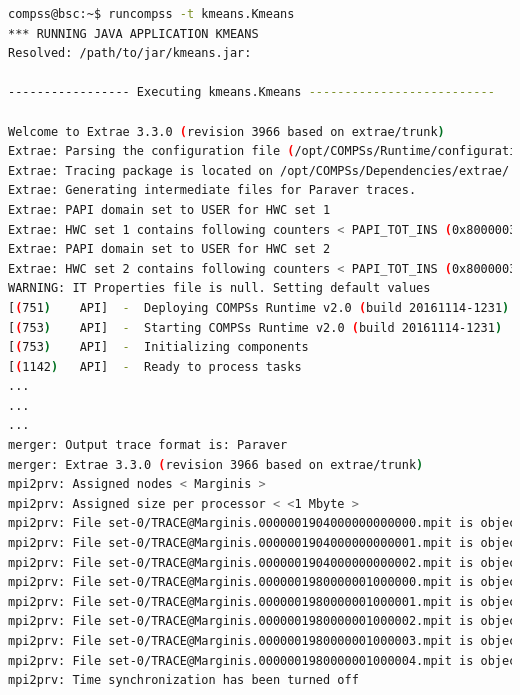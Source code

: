 \begin{lstlisting}[language=bash]
compss@bsc:~$ runcompss -t kmeans.Kmeans
*** RUNNING JAVA APPLICATION KMEANS
Resolved: /path/to/jar/kmeans.jar:

----------------- Executing kmeans.Kmeans --------------------------

Welcome to Extrae 3.3.0 (revision 3966 based on extrae/trunk)
Extrae: Parsing the configuration file (/opt/COMPSs/Runtime/configuration/xml/tracing/extrae_basic.xml) begins
Extrae: Tracing package is located on /opt/COMPSs/Dependencies/extrae/
Extrae: Generating intermediate files for Paraver traces.
Extrae: PAPI domain set to USER for HWC set 1
Extrae: HWC set 1 contains following counters < PAPI_TOT_INS (0x80000032) PAPI_TOT_CYC (0x8000003b) PAPI_LD_INS (0x80000035) PAPI_SR_INS (0x80000036) > - changing every 500000000 nanoseconds
Extrae: PAPI domain set to USER for HWC set 2
Extrae: HWC set 2 contains following counters < PAPI_TOT_INS (0x80000032) PAPI_TOT_CYC (0x8000003b) PAPI_LD_INS (0x80000035) PAPI_SR_INS (0x80000036) PAPI_L2_DCM (0x80000002) > - changing every 500000000 nanoseconds
WARNING: IT Properties file is null. Setting default values
[(751)    API]  -  Deploying COMPSs Runtime v2.0 (build 20161114-1231)
[(753)    API]  -  Starting COMPSs Runtime v2.0 (build 20161114-1231)
[(753)    API]  -  Initializing components
[(1142)   API]  -  Ready to process tasks
...
...
...
merger: Output trace format is: Paraver
merger: Extrae 3.3.0 (revision 3966 based on extrae/trunk)
mpi2prv: Assigned nodes < Marginis >
mpi2prv: Assigned size per processor < <1 Mbyte >
mpi2prv: File set-0/TRACE@Marginis.0000001904000000000000.mpit is object 1.1.1 on node Marginis assigned to processor 0
mpi2prv: File set-0/TRACE@Marginis.0000001904000000000001.mpit is object 1.1.2 on node Marginis assigned to processor 0
mpi2prv: File set-0/TRACE@Marginis.0000001904000000000002.mpit is object 1.1.3 on node Marginis assigned to processor 0
mpi2prv: File set-0/TRACE@Marginis.0000001980000001000000.mpit is object 1.2.1 on node Marginis assigned to processor 0
mpi2prv: File set-0/TRACE@Marginis.0000001980000001000001.mpit is object 1.2.2 on node Marginis assigned to processor 0
mpi2prv: File set-0/TRACE@Marginis.0000001980000001000002.mpit is object 1.2.3 on node Marginis assigned to processor 0
mpi2prv: File set-0/TRACE@Marginis.0000001980000001000003.mpit is object 1.2.4 on node Marginis assigned to processor 0
mpi2prv: File set-0/TRACE@Marginis.0000001980000001000004.mpit is object 1.2.5 on node Marginis assigned to processor 0
mpi2prv: Time synchronization has been turned off

\end{lstlisting}
